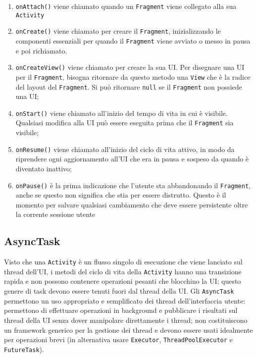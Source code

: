 \begin{enumerate}
\item \texttt{onAttach()} viene chiamato quando un \texttt{Fragment} viene
collegato alla sua \texttt{Activity}
\item \texttt{onCreate()} viene chiamato per creare il \texttt{Fragment},
inizializzando le componenti essenziali per quando il \texttt{Fragment} viene
avviato o messo in pausa e poi richiamato.
\item \texttt{onCreateView()} viene chiamato per creare la sua UI. Per disegnare
una UI per il \texttt{Fragment}, bisogna ritornare da questo metodo una
\texttt{View} che è la radice del layout del \texttt{Fragment}. Si può ritornare
\texttt{null} se il \texttt{Fragment} non possiede una UI;
\item \texttt{onStart()} viene chiamato all'inizio del tempo di vita in cui è
visibile. Qualsiasi modifica alla UI può essere eseguita prima che il
\texttt{Fragment} sia visibile;
\item \texttt{onResume()} viene chiamato all'inizio del ciclo di vita attivo, in
modo da riprendere ogni aggiornamento all'UI che era in pausa e sospeso da quando
è diventato inattivo;
\item \texttt{onPause()} è la prima indicazione che l'utente sta abbandonando il
\texttt{Fragment}, anche se questo non significa che stia per essere distrutto.
Questo è il momento per salvare qualsiasi cambiamento che deve essere
persistente oltre la corrente sessione utente
\end{enumerate}


\subsection{AsyncTask}

Visto che una \texttt{Activity} è un flusso singolo di esecuzione che viene
lanciato sul thread dell'UI, i metodi del ciclo di vita della \texttt{Activity}
hanno una transizione rapida e non possono contenere operazioni pesanti che
blocchino la UI; questo genere di task devono essere tenuti fuori dal thread
della UI.
Gli \texttt{AsyncTask} permettono un uso appropriato e semplificato dei thread
dell'interfaccia utente: permettono di effettuare operazioni in background e
pubblicare i risultati sul thread della UI senza dover manipolare direttamente i
thread; non costituiscono un framework generico per la gestione dei thread e
devono essere usati idealmente per operazioni brevi (in alternativa usare
\texttt{Executor}, \texttt{ThreadPoolExecutor} e \texttt{FutureTask}).

